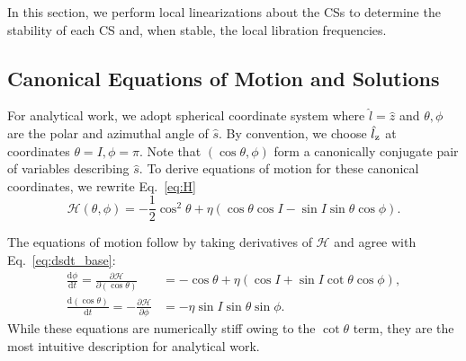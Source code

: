 \documentclass[
        fleqn,
        usenatbib,
        referee,
    ]{mnras}
\newcommand*{\rd}[2]{\frac{\mathrm{d}#1}{\mathrm{d}#2}}
\newcommand*{\pd}[2]{\frac{\partial#1}{\partial#2}}
\newcommand*{\p}[1]{\left(#1\right)}
\begin{document}
In this section, we perform local linearizations about the CSs to determine the
stability of each CS and, when stable, the local libration frequencies.

\subsection{Canonical Equations of Motion and Solutions}

For analytical work, we adopt spherical coordinate system where $\hat{l} =
\hat{z}$ and $\theta, \phi$ are the polar and azimuthal angle of $\hat{s}$. By
convention, we choose $\hat{l}_{\rm z}$ at coordinates $\theta = I, \phi = \pi$.
Note that $\p{\cos \theta, \phi}$ form a canonically conjugate pair of variables
describing $\hat{s}$. To derive equations of motion for these canonical
coordinates, we rewrite Eq.~\eqref{eq:H}
\begin{equation}
    \mathcal{H}\p{\theta, \phi} = -\frac{1}{2}\cos^2\theta
            + \eta \p{\cos \theta \cos I - \sin I \sin \theta \cos \phi}.
\end{equation}

The equations of motion follow by taking derivatives of $\mathcal{H}$ and agree
with Eq.~\eqref{eq:dsdt_base}:
\begin{subequations}\label{se:H_eom}
    \begin{align}
        \rd{\phi}{t} = \pd{\mathcal{H}}{(\cos\theta)}
            &= -\cos\theta + \eta\p{\cos I + \sin I \cot \theta \cos \phi},
                \label{seq:H_eom_phi_t}\\
        \rd{(\cos \theta)}{t} = -\pd{\mathcal{H}}{\phi}
            &= -\eta \sin I \sin \theta \sin \phi.
                \label{seq:H_eom_mu_t}
    \end{align}
\end{subequations}
While these equations are numerically stiff owing to the $\cot\theta$ term, they
are the most intuitive description for analytical work.
\end{document}
